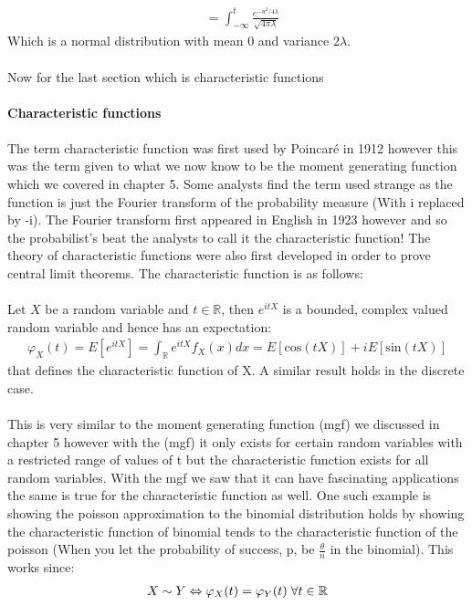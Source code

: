 \documentclass[,oneside]{article}
\begin{document}
\begin{enumerate}
\begin{align*}
&= \int_{-\infty}^{t} \frac{e^{-u^2/4\lambda}}{\sqrt{4\pi\lambda}}
\end{align*}
Which is a normal distribution with mean 0 and variance $2\lambda$.\\ \\
Now for the last section which is characteristic functions\\ \\
\textbf{Characteristic functions}\\ \\
The term characteristic function was first used by Poincaré in 1912 however this was the term given to what we now know to be the moment generating function which we covered in chapter 5. Some analysts find the term used strange as the function is just the Fourier transform of the probability measure (With i replaced by -i). The Fourier transform first appeared in English in 1923 however and so the probabilist's beat the analysts to call it the characteristic function! The theory of characteristic functions were also first developed in order to prove central limit theorems. The characteristic function is as follows:\\ \\
Let $X$ be a random variable and $t \in \mathbb{R}$, then $e^{itX}$ is a bounded, complex valued random variable and hence has an expectation:
\begin{align*}
\varphi_X(t)=E[e^{itX}]=\int_{\mathbb{R}}e^{itX}f_X(x)dx=E[\text{cos}(tX)]+iE[\text{sin}(tX)]
\end{align*}
that defines the characteristic function of X. A similar result holds in the discrete case.\\ \\
This is very similar to the moment generating function (mgf) we discussed in chapter 5 however with the (mgf) it only exists for certain random variables with a restricted range of values of t but the characteristic function exists for all random variables. With the mgf we saw that it can have fascinating applications the same is true for the characteristic function as well. One such example is showing the poisson approximation to the binomial distribution holds by showing the characteristic function of binomial tends to the characteristic function of the poisson (When you let the probability of success, p, be $\frac{\theta}{n}$ in the binomial). This works since:
\begin{align*}
X \sim Y \Leftrightarrow \varphi_X(t)=\varphi_Y(t)\hspace{0.1cm} \forall t \in \mathbb{R}

\end{align*}
\end{enumerate}
\end{document}
